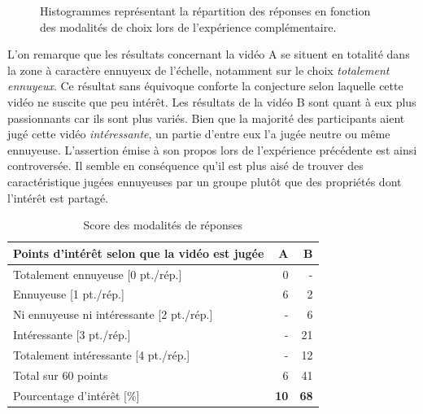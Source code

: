 \documentclass[12pt,fleqn,oneside,openany]{book} %
\begin{document}
\begin{figure}[h!]
\centering
\begin{minipage}[t]{.49\textwidth}
\end{minipage}
\hfill
\begin{minipage}[t]{.49\textwidth}
\end{minipage}
\caption{Histogrammes représentant la répartition des réponses en fonction des modalités de choix lors de l'expérience complémentaire.}
\end{figure}

L'on remarque que les résultats concernant la vidéo A se situent en totalité dans la zone à caractère ennuyeux de l'échelle, notamment sur le choix \emph{totalement ennuyeux}. Ce résultat sans équivoque conforte la conjecture selon laquelle cette vidéo ne suscite que peu intérêt. Les résultats de la vidéo B sont quant à eux plus passionnants car ils sont plus variés. Bien que la majorité des participants aient jugé cette vidéo \emph{intéressante}, un partie d'entre eux l'a jugée neutre ou même ennuyeuse. L'assertion émise à son propos lors de l'expérience précédente est ainsi controversée. Il semble en conséquence qu'il est plus aisé de trouver des caractéristique jugées ennuyeuses par un groupe plutôt que des propriétés dont l'intérêt est partagé.

\begin{table}[h]
	\centering
	\caption{Score des modalités de réponses} \label{tbl:analyse1.2}
	\begin{tabular}{lrr}
		\toprule
		\textbf{Points d'intérêt selon que la vidéo est jugée} & \textbf{A} & \textbf{B} \\ \midrule
		Totalement ennuyeuse [0 pt./rép.] & 0 & - \\ 
		Ennuyeuse [1 pt./rép.] & 6 & 2 \\
		Ni ennuyeuse ni intéressante [2 pt./rép.] & - & 6 \\
		Intéressante [3 pt./rép.] & - & 21 \\ 
		Totalement intéressante [4 pt./rép.] & - & 12 \\ \cmidrule{2-3}
		Total sur 60 points & 6 & 41 \\ 
		Pourcentage d'intérêt [\%] & \textbf{10} & \textbf{68} \\ \bottomrule
	\end{tabular}
\end{table}
\end{document}

